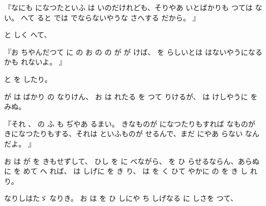 『なにも
になつたといふ
は
いのだけれども、そりやあ
いとばかりも
つては
ない。
へて
ると
では
でならないやうな
さへする
だから。
』

と
しく
へて、

『お
ちやんだつて
に
の
お
の
の
が
が
けば、
を
らしいとは
はないやうになるかも
れないよ。
』

と
を
したり。

が
は
ばかり
の
なりけん、
お
は
れたる
を
つて
りけるが、
は
けしやうに
を
みぬ。

『それ
、
の
ふ
も
ぢやあ
るまい。
きなものが
になつたりもすれば
なものが
きになつたりもする、それは
といふものが
せるんで、まだ
にやあ
らない
なんだよ。
』

お
は
が
を
きもせずして、
ひし
を
に
べながら、
を
ひ
らせるならん、あらぬ
に
を
めて
へ
れば、
は
しげに
を
き
り、
は
を
く
ひて
やかに
の
を
き
し
れり。

なりしはたゞ
なりき。
お
は
を
ひ
しにや
ち
しげなる
に
しさを
つて、


